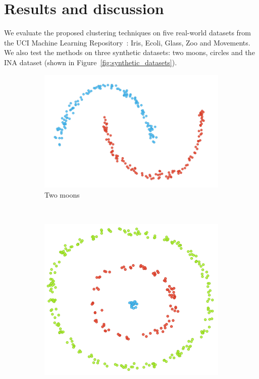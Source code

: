 \documentclass[conference]{IEEEtran}
\begin{document}
\section{Results and discussion}

We evaluate the proposed clustering techniques on five real-world datasets from the UCI Machine Learning Repository~\cite{Lichman:2013}: Iris, Ecoli, Glass, Zoo and Movements. We also test the methods on three synthetic datasets: two moons, circles and the INA dataset (shown in Figure~\ref{fig:synthetic_datasets}).

\begin{figure}[H]
    \centering
    \begin{subfigure}[c]{0.3\columnwidth}
        \includegraphics[width=\columnwidth]{images/moons.png}
        \caption{Two moons}
        \label{fig:synthetic_two_moons}
    \end{subfigure}
    ~
    \begin{subfigure}[c]{0.3\columnwidth}
        \includegraphics[width=\columnwidth]{images/circles.png}

\end{subfigure}
\end{figure}
\end{document}
